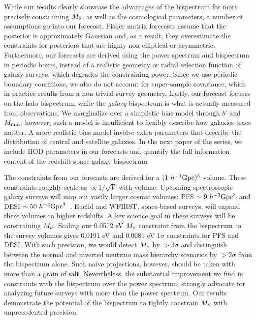 While our results clearly showcase the advantages of the bispectrum for
more precisely constraining $M_\nu$, as well as the cosmological parameters, 
a number of assumptions go into our forecast. Fisher matrix forecasts assume 
that the posterior is approximately Gaussian and, as a result, they 
overestimate the constraints for posteriors that are highly non-elliptical 
or asymmetric. Furthermore, our forecasts are derived using the power spectrum 
and bispectrum in periodic boxes, instead of a realistic geometry or 
radial selection function of galaxy surveys, which degrades the constraining power. 
Since we use periodic boundary conditions, we also do not account for super-sample
covariance, which in practice results from a non-trivial survey geometry. Lastly, 
our forecast focuses on the halo bispectrum, while the \emph{galaxy} bispectrum 
is what is actually measured from observations. We marginalize over a simplistic bias 
model through $b'$ and $M_{\rm min}$; however, such a model is insufficient to 
flexibly describe how galaxies trace matter. A more realistic bias model 
involve extra parameters that describe the distribution of central and satellite 
galaxies. In the next paper of the series, we include HOD parameters in our
forecasts and quantify the full information content of the redshift-space 
galaxy bispectrum. 

The constraints from our forecasts are derived for a $(1~h^{-1}{\rm Gpc})^3$ 
volume. These constraints roughly scale as $\propto1/\sqrt{V}$ with volume. 
Upcoming spectroscopic galaxy surveys will map out vastly larger cosmic
volumes: PFS $\sim 9~h^{-3}{\rm Gpc}^3$ and DESI $\sim 50~h^{-3}{\rm Gpc}^3$~\citep{takada2014, desicollaboration2016}. 
Euclid and WFIRST, space-based surveys, will expand these volumes to 
higher redshifts. A key science goal in these surveys will be constraining $M_\nu$. 
Scaling our 0.0572 eV $M_\nu$ constraint from the bispectrum to the survey 
volumes gives 0.0191 eV and 0.0081 eV $1\sigma$ constraints for PFS and DESI. 
With such precision, we would detect $M_\nu$ by $>3\sigma$ and 
distinguish between the normal and inverted neutrino mass hierarchy scenarios 
by $>2\sigma$ from the bispectrum alone. Such naive projections, however, 
should be taken with more than a grain of salt. Nevertheless, the substantial 
improvement we find in constraints with the bispectrum over the power spectrum, 
strongly advocate for analyzing future surveys with more than the power spectrum. 
Our results demonstrate the potential of the bispectrum to tightly constrain 
$M_\nu$ with unprecedented precision.
